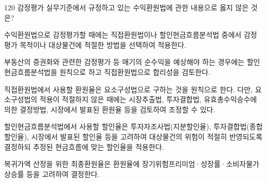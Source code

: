 \begin{question}{120}
감정평가 실무기준에서 규정하고 있는 수익환원법에 관한 내용으로 옳지 않은 것은?
\begin{choices}
  \item 수익환원법으로 감정평가할 때에는 직접환원법이나 할인현금흐름분석법 중에서 감정평가 목적이나 대상물건에 적절한 방법을 선택하여 적용한다.
  \item 부동산의 증권화와 관련한 감정평가 등 매기의 순수익을 예상해야 하는 경우에는 할인현금흐름분석법을 원칙으로 하고 직접환원법으로 합리성을 검토한다.
  \item 직접환원법에서 사용할 환원율은 요소구성법으로 구하는 것을 원칙으로 한다. 다만, 요소구성법의 적용이 적절하지 않은 때에는 시장추출법, 투자결합법, 유효총수익승수에 의한 결정방법, 시장에서 발표된 환원율 등을 검토하여 조정할 수 있다.
  \item 할인현금흐름분석법에서 사용할 할인율은 투자자조사법(지분할인율), 투자결합법(종합할인율), 시장에서 발표된 할인율 등을 고려하여 대상물건의 위험이 적절히 반영되도록 결정하되 추정된 현금흐름에 맞는 할인율을 적용한다.
  \item 복귀가액 산정을 위한 최종환원율은 환원율에 장기위험프리미엄·성장률·소비자물가 상승률 등을 고려하여 결정한다.
\end{choices}
\end{question}
